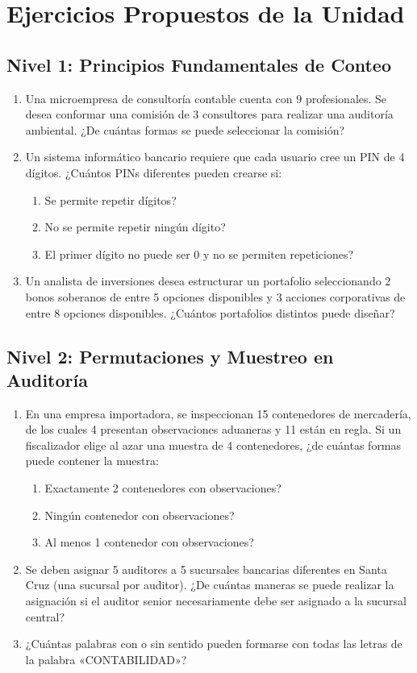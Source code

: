 \section{Ejercicios Propuestos de la Unidad}
\subsection*{Nivel 1: Principios Fundamentales de Conteo}
\begin{enumerate}
    \item Una microempresa de consultoría contable cuenta con 9 profesionales. Se desea conformar una comisión de 3 consultores para realizar una auditoría ambiental. ¿De cuántas formas se puede seleccionar la comisión?
    \item Un sistema informático bancario requiere que cada usuario cree un PIN de 4 dígitos. ¿Cuántos PINs diferentes pueden crearse si:
    \begin{enumerate}[label=\alph*)]
        \item Se permite repetir dígitos?
        \item No se permite repetir ningún dígito?
        \item El primer dígito no puede ser 0 y no se permiten repeticiones?
    \end{enumerate}
    \item Un analista de inversiones desea estructurar un portafolio seleccionando 2 bonos soberanos de entre 5 opciones disponibles y 3 acciones corporativas de entre 8 opciones disponibles. ¿Cuántos portafolios distintos puede diseñar?
\end{enumerate}

\subsection*{Nivel 2: Permutaciones y Muestreo en Auditoría}
\begin{enumerate}[resume]
    \item En una empresa importadora, se inspeccionan 15 contenedores de mercadería, de los cuales 4 presentan observaciones aduaneras y 11 están en regla. Si un fiscalizador elige al azar una muestra de 4 contenedores, ¿de cuántas formas puede contener la muestra:
    \begin{enumerate}[label=\alph*)]
        \item Exactamente 2 contenedores con observaciones?
        \item Ningún contenedor con observaciones?
        \item Al menos 1 contenedor con observaciones?
    \end{enumerate}
    \item Se deben asignar 5 auditores a 5 sucursales bancarias diferentes en Santa Cruz (una sucursal por auditor). ¿De cuántas maneras se puede realizar la asignación si el auditor senior necesariamente debe ser asignado a la sucursal central?
    \item ¿Cuántas palabras con o sin sentido pueden formarse con todas las letras de la palabra «CONTABILIDAD»?
\end{enumerate}

